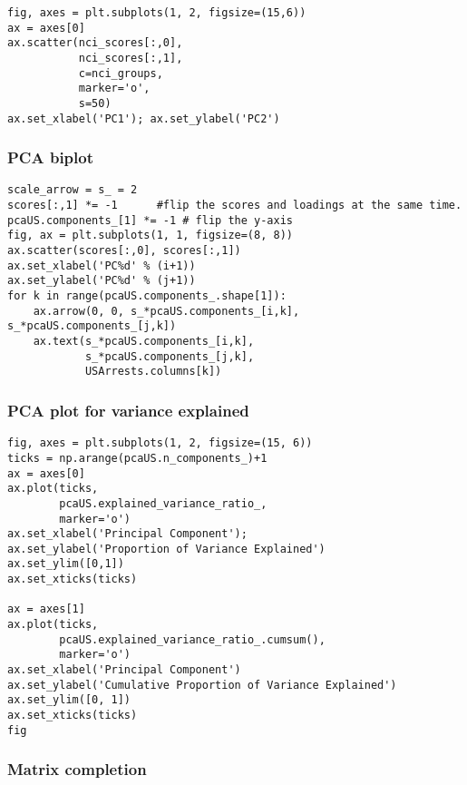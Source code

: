\documentclass[
  letterpaper,
  DIV=11,
  numbers=noendperiod]{scrreprt}
\begin{document}
\begin{verbatim}
fig, axes = plt.subplots(1, 2, figsize=(15,6))
ax = axes[0]
ax.scatter(nci_scores[:,0],
           nci_scores[:,1],
           c=nci_groups,
           marker='o',
           s=50)
ax.set_xlabel('PC1'); ax.set_ylabel('PC2')
\end{verbatim}

\subsubsection{PCA biplot}\label{pca-biplot}

\begin{verbatim}
scale_arrow = s_ = 2
scores[:,1] *= -1      #flip the scores and loadings at the same time. 
pcaUS.components_[1] *= -1 # flip the y-axis
fig, ax = plt.subplots(1, 1, figsize=(8, 8))
ax.scatter(scores[:,0], scores[:,1])
ax.set_xlabel('PC%d' % (i+1))
ax.set_ylabel('PC%d' % (j+1))
for k in range(pcaUS.components_.shape[1]):
    ax.arrow(0, 0, s_*pcaUS.components_[i,k], s_*pcaUS.components_[j,k])
    ax.text(s_*pcaUS.components_[i,k],
            s_*pcaUS.components_[j,k],
            USArrests.columns[k])
\end{verbatim}

\subsubsection{PCA plot for variance
explained}\label{pca-plot-for-variance-explained}

\begin{verbatim}
fig, axes = plt.subplots(1, 2, figsize=(15, 6))
ticks = np.arange(pcaUS.n_components_)+1
ax = axes[0]
ax.plot(ticks,
        pcaUS.explained_variance_ratio_,
        marker='o')
ax.set_xlabel('Principal Component');
ax.set_ylabel('Proportion of Variance Explained')
ax.set_ylim([0,1])
ax.set_xticks(ticks)

ax = axes[1]
ax.plot(ticks,
        pcaUS.explained_variance_ratio_.cumsum(),
        marker='o')
ax.set_xlabel('Principal Component')
ax.set_ylabel('Cumulative Proportion of Variance Explained')
ax.set_ylim([0, 1])
ax.set_xticks(ticks)
fig
\end{verbatim}

\subsubsection{Matrix completion}\label{matrix-completion}
\end{document}
